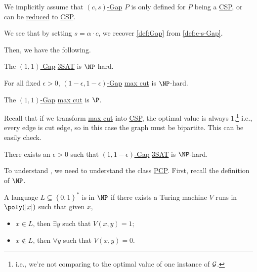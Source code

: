 \begin{note}
	We implicitly assume that \hyperref[def:c-s-Gap]{\((c, s)\)-Gap} \(P\) is only defined for \(P\) being a \hyperref[prb:CSP]{CSP}, or can be \hyperref[def:reduction]{reduced} to \hyperref[prb:CSP]{CSP}.
\end{note}

\begin{remark}
	We see that by setting \(s = \alpha \cdot c\), we recover \autoref{def:Gap} from \autoref{def:c-s-Gap}.
\end{remark}

Then, we have the following.

\begin{theorem}\label{thm:Cook-Levin}
	The \hyperref[def:c-s-Gap]{\((1, 1)\)-Gap} \hyperref[prb:max-3SAT]{3SAT} is \(\NP\)-hard.
\end{theorem}

\begin{theorem}\label{thm:Karp}
	For all fixed \(\epsilon > 0\), \hyperref[def:c-s-Gap]{\((1-\epsilon , 1-\epsilon )\)-Gap} \hyperref[prb:max-cut]{max cut} is \(\NP\)-hard.
\end{theorem}

\begin{note}
	The \hyperref[def:c-s-Gap]{\((1, 1)\)-Gap} \hyperref[prb:max-cut]{max cut} is \(\P\).
\end{note}
\begin{explanation}
	Recall that if we transform \hyperref[prb:max-cut]{max cut} into \hyperref[prb:CSP]{CSP}, the optimal value is always \(1\),\footnote{i.e., we're not comparing to the optimal value of one instance of \(\mathcal{\MakeUppercase{g}} \).} i.e., every edge is cut edge, so in this case the graph must be bipartite. This can be easily check.
\end{explanation}

\begin{theorem}\label{thm:PCP}
	There exists an \(\epsilon > 0\) such that \hyperref[def:c-s-Gap]{\((1, 1-\epsilon )\)-Gap} \hyperref[prb:max-3SAT]{3SAT} is \(\NP\)-hard.
\end{theorem}

To understand \href{thm:PCP}, we need to understand the class \hyperref[def:PCP]{PCP}. First, recall the definition of \(\NP\).

\begin{prev}[\(\NP\)]
	A language \(L \subseteq \left\{ 0, 1 \right\} ^{\ast}\) is in \(\NP\) if there exists a Turing machine \(V\) runs in \(\poly(\vert x \vert )\) such that given \(x\),
	\begin{itemize}
		\item \(x\in L\), then \(\exists y\) such that \(V(x, y) = 1\);
		\item \(x \notin L\), then \(\forall y\) such that \(V(x, y) = 0\).
	\end{itemize}
\end{prev}

